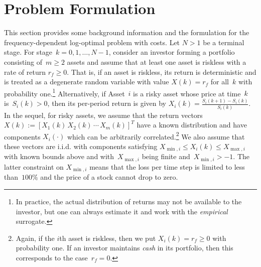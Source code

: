 \documentclass[10pt]{article} %
\begin{document}
	\section{Problem Formulation}\label{sec: problem formulation}	
	This section provides some background information and the formulation for the frequency-dependent log-optimal problem with costs.
	Let $N > 1$ be a terminal stage. 
	For stage~$k=0,1,\dots, N-1$, consider an investor forming a portfolio consisting of~$m \geq 2$ assets and assume that at least one asset is riskless with a rate of return $r_f \geq 0.$ That is, if an asset is riskless, its return is deterministic and is treated as a degenerate random variable with value $X(k) = r_f$ for all~$k$ with probability one.\footnote{In practice, the actual distribution of returns may not be available to the investor, but one can always estimate it and work with the \textit{empirical} surrogate.} 
	Alternatively, if Asset~$i$ is a risky asset whose price at time~$k$ is~$S_i(k)>0$, then its per-period return is given by
	$
	X_i(k) = \frac{S_i(k+1) - S_i(k)}{S_i(k)}.
	$
	In the sequel, for risky assets, we assume that the return vectors~$
	X(k):=\left[X_1(k) \, X_2(k)\,  \cdots \,X_m(k)\right]^T
	$
	have a known distribution and have components $X_i(\cdot)$ which can be arbitrarily correlated.\footnote{Again, if the $i$th asset is riskless, then we put $X_i(k) = r_f \geq 0$ with probability one. If an investor maintains \textit{cash} in its portfolio, then this corresponds to the case~{$r_f=0.$}} 
	We also assume that these vectors are i.i.d. with components satisfying
	$
	X_{\min,i}  \leq X_i(k) \leq X_{\max,i}
	$
	with known bounds above and with~$X_{\max,i}$ being finite and~{$X_{\min,i} > -1$}.
	The latter constraint on $X_{\min, i}$ means that the loss per time step is limited to less than~$100\%$ and the price of a stock cannot drop to zero. 	
	
	
\end{document}
